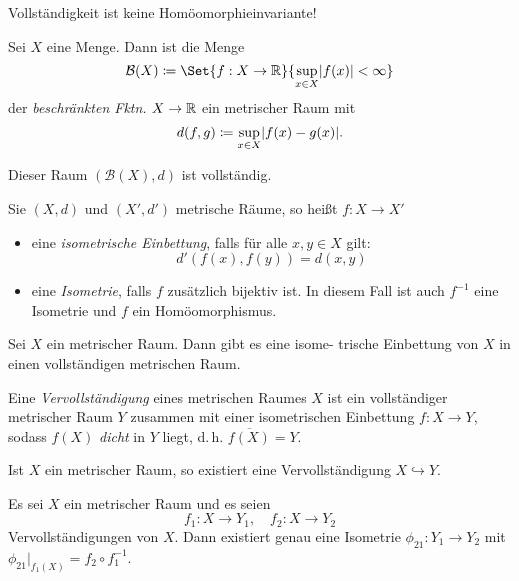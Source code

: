 \documentclass{cheat-sheet}
\begin{document}
\begin{acht}
  Vollständigkeit ist keine Homöomorphieinvariante!
\end{acht}

\begin{defn}
  Sei $X$ eine Menge. Dann ist die Menge
  \[ \mathcal{B}(X) \coloneqq \Set{ f : X \to \R }{ \sup_{x \in X} \abs{f(x)} < \infty } \]
  der \emph{beschränkten Fktn.} $X \to \mathbb{R}$ ein metrischer Raum mit
  \[ d(f, g) \coloneqq \sup_{x \in X} \lvert f(x) - g(x)\rvert. \]
\end{defn}

\begin{prop}
  Dieser Raum $(\mathcal{B}(X), d)$ ist vollständig.
\end{prop}

\begin{defn}
  Sie $(X, d)$ und $(X', d')$ metrische Räume, so heißt $f : X \to X'$
  \begin{itemize}
    \item eine \emph{isometrische Einbettung}, falls für alle $x , y \in X$ gilt:
    \[ d'(f(x), f(y)) = d(x, y) \]
    \item eine \emph{Isometrie}, falls $f$ zusätzlich bijektiv ist. In diesem Fall ist auch $f^{-1}$ eine Isometrie und $f$ ein Homöomorphismus.
  \end{itemize}
\end{defn}

\begin{prop}
  Sei $X$ ein metrischer Raum. Dann gibt es eine isome- trische Einbettung von $X$ in einen vollständigen metrischen Raum.
\end{prop}


\begin{defn}
  Eine \emph{Vervollständigung} eines metrischen Raumes $X$ ist ein vollständiger metrischer Raum $Y$ zusammen mit einer isometrischen Einbettung $f : X \to Y$, sodass $f(X)$ \emph{dicht}  in $Y$ liegt, d.\,h. $\overline{f(X)} = Y$.
\end{defn}

\begin{satz}
  Ist $X$ ein metrischer Raum, so existiert eine Vervollständigung $X \hookrightarrow Y$.
\end{satz}

\begin{prop}
  Es sei $X$ ein metrischer Raum und es seien
  \[ f_1 : X \to Y_1, \quad f_2 : X \to Y_2 \]
  Vervollständigungen von $X$. Dann existiert genau eine Isometrie $\phi_{21} : Y_1 \to Y_2$ mit $\phi_{21}|_{f_1(X)} = f_2 \circ f_1^{-1}$.
\end{prop}
\end{document}

